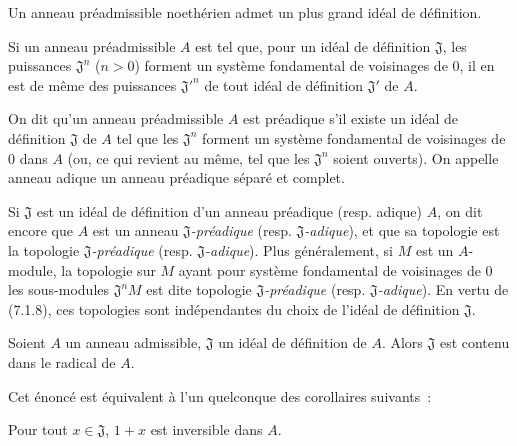 
\begin{corollary}[7.1.7]
\label{0.7.1.7-fr}
Un anneau préadmissible noethérien admet un plus grand idéal de définition.
\end{corollary}

\begin{corollary}[7.1.8]
\label{0.7.1.8-fr}
Si un anneau préadmissible $A$ est tel que, pour un idéal de définition
$\mathfrak J$, les puissances $\mathfrak J^n$ ($n>0$) forment un système
fondamental de voisinages de $0$, il en est de même des puissances
${\mathfrak J'}^n$ de tout idéal de définition $\mathfrak J'$ de $A$.
\end{corollary}

\begin{definition}[7.1.9]
\label{0.7.1.9-fr}
On dit qu'un anneau préadmissible $A$ est préadique s'il existe un idéal de
définition $\mathfrak J$ de $A$ tel que les $\mathfrak J^n$ forment un système
fondamental de voisinages de $0$ dans $A$ (ou, ce qui revient au même, tel que
les $\mathfrak J^n$ soient ouverts). On appelle anneau adique un anneau
préadique séparé et complet.
\end{definition}

Si $\mathfrak J$ est un idéal de définition d'un anneau préadique (resp.
adique) $A$, on dit encore que $A$ est un anneau
\emph{$\mathfrak J$-préadique} (resp. \emph{$\mathfrak J$-adique}), et que sa
topologie est la topologie \emph{$\mathfrak J$-préadique} (resp.
\emph{$\mathfrak J$-adique}). Plus généralement, si $M$ est un $A$-module, la
topologie sur $M$ ayant pour système fondamental de voisinages de $0$ les
sous-modules $\mathfrak J^nM$ est dite topologie
\emph{$\mathfrak J$-préadique} (resp. \emph{$\mathfrak J$-adique}). En vertu
de (7.1.8), ces topologies sont indépendantes du choix de l'idéal de définition
$\mathfrak J$.

\begin{proposition}[7.1.10]
\label{0.7.1.10-fr}
Soient $A$ un anneau admissible, $\mathfrak J$ un idéal de définition de $A$.
Alors $\mathfrak J$ est contenu dans le radical de $A$.
\end{proposition}

Cet énoncé est équivalent à l'un quelconque des corollaires suivants~:

\begin{corollary}[7.1.11]
\label{0.7.1.11-fr}
Pour tout $x\in\mathfrak J$, $1+x$ est inversible dans $A$.
\end{corollary}

